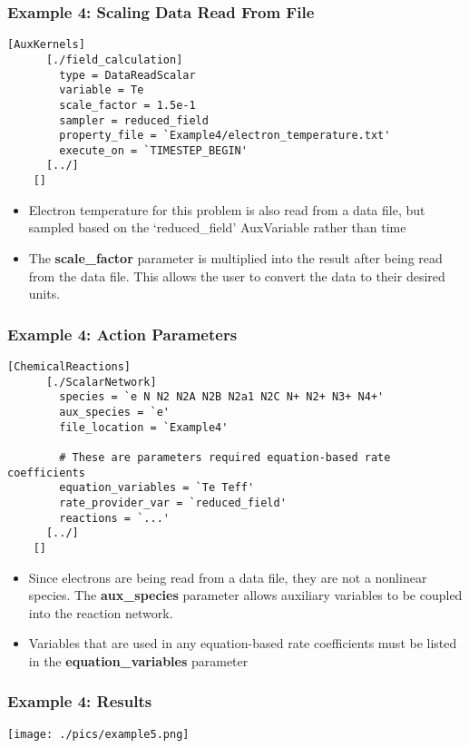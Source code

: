 \begin{frame}[fragile]
	\frametitle{Example 4: Scaling Data Read From File}
	\begin{Verbatim}[fontsize=\scriptsize]
    [AuxKernels]
      [./field_calculation]
        type = DataReadScalar
        variable = Te
        scale_factor = 1.5e-1
        sampler = reduced_field
        property_file = `Example4/electron_temperature.txt'
        execute_on = `TIMESTEP_BEGIN'
      [../]
    []
	\end{Verbatim}
	\begin{itemize}
		\item Electron temperature for this problem is also read from a data file, but sampled based on the `reduced\_field' AuxVariable rather than time
		\item The \textbf{scale\_factor} parameter is multiplied into the result after being read from the data file. This allows the user to convert the data to their desired units.
	\end{itemize}
\end{frame}

\begin{frame}[fragile]
	\frametitle{Example 4: Action Parameters}
	\begin{Verbatim}[fontsize=\tiny]
    [ChemicalReactions]
      [./ScalarNetwork]
        species = `e N N2 N2A N2B N2a1 N2C N+ N2+ N3+ N4+'
        aux_species = `e'
        file_location = `Example4'

        # These are parameters required equation-based rate coefficients
        equation_variables = `Te Teff'
        rate_provider_var = `reduced_field'
        reactions = `...'
      [../]
    []
	\end{Verbatim}
	\begin{itemize}
		\item Since electrons are being read from a data file, they are not a nonlinear species. The \textbf{aux\_species} parameter allows auxiliary variables to be coupled into the reaction network.
		\item Variables that are used in any equation-based rate coefficients must be listed in the \textbf{equation\_variables} parameter
	\end{itemize}
\end{frame}

\begin{frame}
	\frametitle{Example 4: Results}
	\centering
	\texttt{[image: ./pics/example5.png]}
\end{frame}
